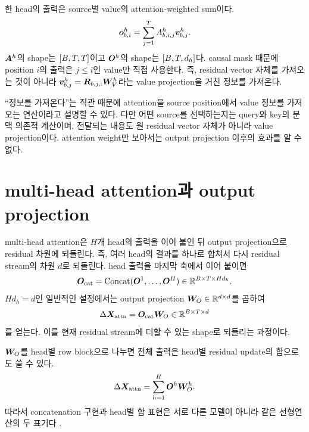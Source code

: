 한 head의 출력은 source별 value의 attention-weighted sum이다.
\begin{equation}
  \bm{o}^{h}_{b,i}=\sum_{j=1}^{T}A^h_{b,i,j}\bm{v}^{h}_{b,j}.
  \label{eq:head-weighted-sum}
\end{equation}
$\bm{A}^{h}$의 shape는 $\left[B,T,T\right]$이고 $\bm{O}^{h}$의 shape는 $\left[B,T,d_h\right]$다.
causal mask 때문에 position $i$의 출력은 $j\le i$인 value만 직접 사용한다.
즉, residual vector 자체를 가져오는 것이 아니라 $\bm{v}^{h}_{b,j}=\bm{R}_{b,j,:}\bm{W}^{h}_{V}$라는 value projection을 거친 정보를 가져온다.

\begin{interpretbox}{``정보를 가져온다''는 직관}
 때문에 attention을 source position에서 value 정보를 가져오는 연산이라고 설명할 수 있다.
다만 어떤 source를 선택하는지는 query와 key의 문맥 의존적 계산이며, 전달되는 내용도 원 residual vector 자체가 아니라 value projection이다.
attention weight만 보아서는 output projection 이후의 효과를 알 수 없다.
\end{interpretbox}

\section{multi-head attention과 output projection}

multi-head attention은 $H$개 head의 출력을 이어 붙인 뒤 output projection으로 residual 차원에 되돌린다.
즉, 여러 head의 결과를 하나로 합쳐서 다시 residual stream의 차원 $d$로 되돌린다.
head 출력을 마지막 축에서 이어 붙이면
\begin{equation}
  \bm{O}_{\mathrm{cat}}=\operatorname{Concat}
  (\bm{O}^{1},\ldots,\bm{O}^{H})
  \in\mathbb{R}^{B\times T\times Hd_h}.
\end{equation}
$Hd_h=d$인 일반적인 설정에서는 output projection $\bm{W}_{O}\in\mathbb{R}^{d\times d}$를 곱하여
\begin{equation}
  \Delta\bm{X}_{\mathrm{attn}}=
  \bm{O}_{\mathrm{cat}}\bm{W}_{O}
  \in\mathbb{R}^{B\times T\times d}
\end{equation}
를 얻는다.
이를 현재 residual stream에 더할 수 있는 shape로 되돌리는 과정이다.

$\bm{W}_{O}$를 head별 row block으로 나누면 전체 출력은 head별 residual update의 합으로도 쓸 수 있다.
\begin{equation}
  \Delta\bm{X}_{\mathrm{attn}}
  =\sum_{h=1}^{H}\bm{O}^{h}\bm{W}^{h}_{O}.
\end{equation}
따라서 concatenation 구현과 head별 합 표현은 서로 다른 모델이 아니라 같은 선형연산의 두 표기다 \citep{elhage2021framework}.

